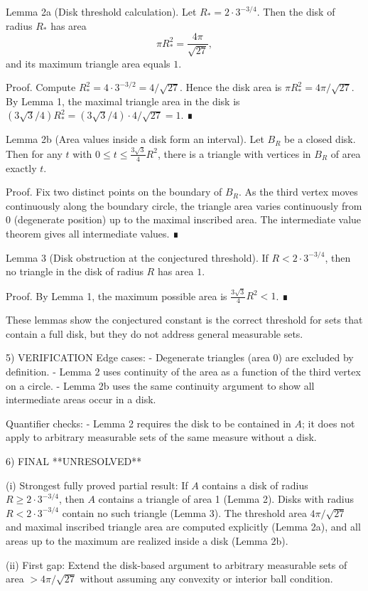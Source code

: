 Lemma 2a (Disk threshold calculation).
Let $R_*=2\cdot 3^{-3/4}$. Then the disk of radius $R_*$ has area
\[
\pi R_*^2=\frac{4\pi}{\sqrt{27}},
\]
and its maximum triangle area equals $1$.

Proof.
Compute $R_*^2=4\cdot 3^{-3/2}=4/\sqrt{27}$. Hence the disk area is
$\pi R_*^2=4\pi/\sqrt{27}$. By Lemma 1, the maximal triangle area in the disk is
$(3\sqrt{3}/4)R_*^2=(3\sqrt{3}/4)\cdot 4/\sqrt{27}=1$. ∎

Lemma 2b (Area values inside a disk form an interval).
Let $B_R$ be a closed disk. Then for any $t$ with $0\le t\le \frac{3\sqrt{3}}{4}R^2$,
there is a triangle with vertices in $B_R$ of area exactly $t$.

Proof.
Fix two distinct points on the boundary of $B_R$. As the third vertex moves continuously along
the boundary circle, the triangle area varies continuously from $0$ (degenerate position) up to
the maximal inscribed area. The intermediate value theorem gives all intermediate values. ∎

Lemma 3 (Disk obstruction at the conjectured threshold).
If $R<2\cdot 3^{-3/4}$, then no triangle in the disk of radius $R$ has area $1$.

Proof.
By Lemma 1, the maximum possible area is $\frac{3\sqrt{3}}{4}R^2<1$. ∎

These lemmas show the conjectured constant is the correct threshold for sets that contain a full disk,
but they do not address general measurable sets.

5) VERIFICATION
Edge cases:
- Degenerate triangles (area 0) are excluded by definition.
- Lemma 2 uses continuity of the area as a function of the third vertex on a circle.
- Lemma 2b uses the same continuity argument to show all intermediate areas occur in a disk.

Quantifier checks:
- Lemma 2 requires the disk to be contained in $A$; it does not apply to arbitrary measurable sets
  of the same measure without a disk.

6) FINAL
**UNRESOLVED**

(i) Strongest fully proved partial result:
If $A$ contains a disk of radius $R\ge 2\cdot 3^{-3/4}$, then $A$ contains a triangle of area 1
(Lemma 2). Disks with radius $R<2\cdot 3^{-3/4}$ contain no such triangle (Lemma 3). The threshold
area $4\pi/\sqrt{27}$ and maximal inscribed triangle area are computed explicitly (Lemma 2a), and
all areas up to the maximum are realized inside a disk (Lemma 2b).

(ii) First gap:
Extend the disk-based argument to arbitrary measurable sets of area $>4\pi/\sqrt{27}$ without
assuming any convexity or interior ball condition.

